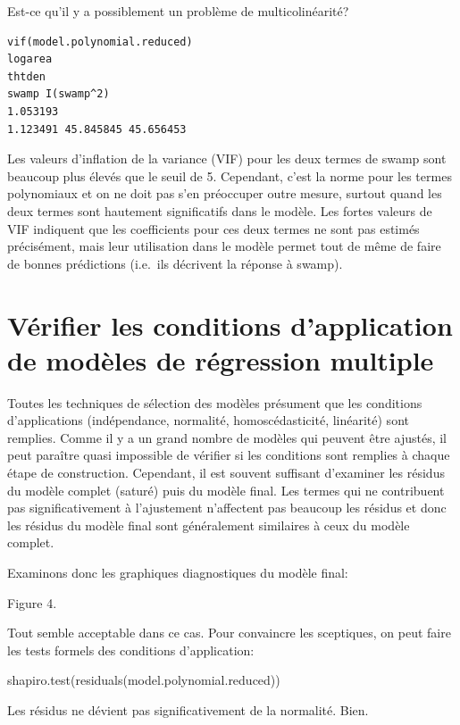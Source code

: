 \documentclass[12pt,]{book}
\begin{document}
Est-ce qu'il y a possiblement un problème de multicolinéarité?

\begin{verbatim}
vif(model.polynomial.reduced)
logarea
thtden
swamp I(swamp^2)
1.053193
1.123491 45.845845 45.656453
\end{verbatim}

Les valeurs d'inflation de la variance (VIF) pour les deux termes de swamp sont beaucoup plus élevés que le seuil de 5. Cependant, c'est la norme pour les termes polynomiaux et on ne doit pas s'en préoccuper outre mesure, surtout quand les deux termes sont hautement significatifs dans le modèle. Les fortes valeurs de VIF indiquent que les coefficients pour ces deux termes ne sont pas estimés précisément, mais leur utilisation dans le modèle permet tout de même de faire de bonnes prédictions (i.e.~ils décrivent la réponse à swamp).

\hypertarget{vuxe9rifier-les-conditions-dapplication-de-moduxe8les-de-ruxe9gression-multiple}{%
\section{Vérifier les conditions d'application de modèles de régression multiple}\label{vuxe9rifier-les-conditions-dapplication-de-moduxe8les-de-ruxe9gression-multiple}}

Toutes les techniques de sélection des modèles présument que les conditions d'applications (indépendance, normalité, homoscédasticité, linéarité) sont remplies. Comme il y a un grand nombre de modèles qui peuvent être ajustés, il peut paraître quasi impossible de vérifier si les conditions sont remplies à chaque étape de construction. Cependant, il est souvent suffisant d'examiner les résidus du modèle complet (saturé) puis du modèle final. Les termes qui ne contribuent pas significativement à l'ajustement n'affectent pas beaucoup les résidus et donc les résidus du modèle final sont généralement similaires à ceux du modèle complet.

Examinons donc les graphiques diagnostiques du modèle final:

Figure 4.

Tout semble acceptable dans ce cas. Pour convaincre les sceptiques, on peut faire les tests formels des conditions d'application:

shapiro.test(residuals(model.polynomial.reduced))

Les résidus ne dévient pas significativement de la normalité. Bien.
\end{document}
